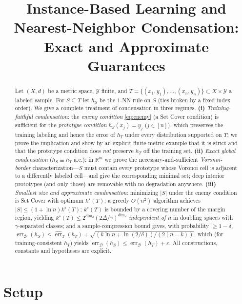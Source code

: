 \documentclass{amsart}
\theoremstyle{definition}
\DeclareMathOperator{\err}{err}
\begin{document}
\title{Instance-Based Learning and Nearest-Neighbor Condensation:\\
Exact and Approximate Guarantees}
\maketitle

\begin{abstract}
Let $(X,d)$ be a metric space, $\mathcal Y$ finite, and
$T=\{(x_1,y_1),\dots,(x_n,y_n)\}\subset X\times\mathcal Y$ a labeled sample. For
$S\subseteq T$ let $h_S$ be the $1$-NN rule on $S$ (ties broken by a fixed index
order). We give a complete treatment of condensation in three regimes.
\textbf{(i)} \emph{Training-faithful condensation}: the \emph{enemy condition}
\eqref{eq:enemy} (a Set Cover condition) is sufficient for the \emph{prototype
condition} $h_S(x_j)=y_j$ ($j\in[n]$), which preserves the training labeling and
hence the error of $h_T$ under every distribution supported on $T$; we prove the
implication and show by an explicit finite-metric example that it is strict and
that the prototype condition does \emph{not} preserve $h_T$ off the training
set. \textbf{(ii)} \emph{Exact global condensation} ($h_S\equiv h_T$ a.e.):
in $\mathbb R^m$ we prove the necessary-and-sufficient \emph{Voronoi-border}
characterization---$S$ must contain every prototype whose Voronoi cell is
adjacent to a differently labeled cell---and give the corresponding minimal set;
deep interior prototypes (and only those) are removable with no degradation
anywhere. \textbf{(iii)} \emph{Smallest size and approximate condensation}:
minimizing $|S|$ under the enemy condition is Set Cover with optimum
$k^\star(T)$; a greedy $O(n^2)$ algorithm achieves $|S|\le(1+\ln n)k^\star(T)$;
$k^\star(T)$ is bounded by a covering number of the margin region, yielding
$k^\star(T)\le 2^{\dim_d}(2\Delta/\gamma)^{\dim_d}$ \emph{independent of $n$} in
doubling spaces with $\gamma$-separated classes; and a sample-compression bound
gives, with probability $\ge1-\delta$,
$\err_\mathcal D(h_S)\le\widehat{\err}_T(h_T)+
\sqrt{(k\ln n+\ln(2/\delta))/(2(n-k))}$, which (for training-consistent $h_T$)
yields $\err_\mathcal D(h_S)\le\err_\mathcal D(h_T)+\varepsilon$. All
constructions, constants and hypotheses are explicit.
\end{abstract}

\section{Setup}\label{sec:setup}
\end{document}
